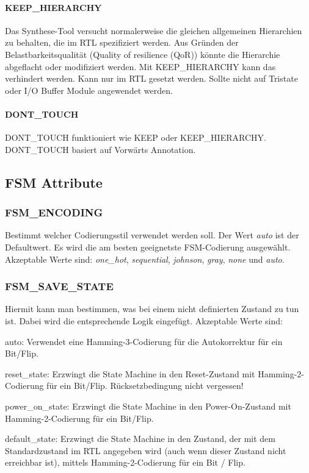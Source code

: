 \paragraph{KEEP\_HIERARCHY}
Das Synthese-Tool versucht normalerweise die gleichen allgemeinen Hierarchien zu behalten, die im RTL spezifiziert werden. Aus Gründen der Belastbarkeitsqualität (Quality of resilience (QoR)) könnte die Hierarchie abgeflacht oder modifiziert werden. Mit KEEP\_HIERARCHY kann das verhindert werden. Kann nur im RTL gesetzt werden. Sollte nicht auf Tristate oder I/O Buffer Module angewendet werden.


\paragraph{DONT\_TOUCH}
DONT\_TOUCH funktioniert wie KEEP oder KEEP\_HIERARCHY. DONT\_TOUCH basiert auf Vorwärts Annotation.

\subsection{FSM Attribute}
\subsubsection{FSM\_ENCODING}
Bestimmt welcher Codierungsstil verwendet werden soll. Der Wert \textit{auto} ist der Defaultwert. Es wird die am besten geeignetste FSM-Codierung ausgewählt. Akzeptable Werte sind: \textit{one\_hot}, \textit{sequential}, \textit{johnson}, \textit{gray}, \textit{none} und \textit{auto}.


\subsubsection{FSM\_SAVE\_STATE}
Hiermit kann man bestimmen, was bei einem nicht definierten Zustand zu tun ist. Dabei wird die entsprechende Logik eingefügt. Akzeptable Werte sind:
\begin{compactitem}
    \item auto: Verwendet eine Hamming-3-Codierung für die Autokorrektur für ein Bit/Flip.
    \item reset\_state: Erzwingt die State Machine in den Reset-Zustand mit Hamming-2-Codierung für ein Bit/Flip. Rücksetzbedingung nicht vergessen!
    \item power\_on\_state: Erzwingt die State Machine in den Power-On-Zustand mit Hamming-2-Codierung für ein Bit/Flip.
    \item default\_state: Erzwingt die State Machine in den Zustand, der mit dem Standardzustand im RTL angegeben wird (auch wenn dieser Zustand nicht erreichbar ist), mittels Hamming-2-Codierung für ein Bit / Flip.
\end{compactitem}


